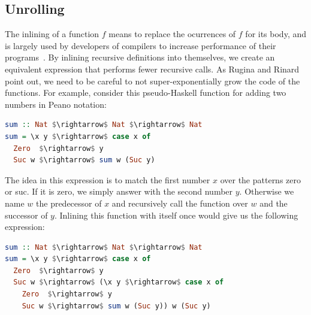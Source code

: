 \documentclass[runningheads]{llncs}
\newcommand{\tN}{\mathbb{N}}
\begin{document}
\subsection{Unrolling}
The inlining of a function $f$ means to replace 
the ocurrences of $f$ for its body, and is largely used 
by developers of compilers to increase performance 
of their programs~\cite{appel04}. By 
inlining recursive definitions into themselves, 
we create an equivalent expression that performs 
fewer recursive calls. As Rugina and 
Rinard~\cite{rugina00} point out, we need to be 
careful to not super-exponentially grow the code 
of the functions. For example, consider this 
pseudo-Haskell function for adding two numbers in Peano notation:

\begin{lstlisting}[language=Haskell, mathescape=true]
sum :: Nat $\rightarrow$ Nat $\rightarrow$ Nat
sum = \x y $\rightarrow$ case x of 
  Zero  $\rightarrow$ y
  Suc w $\rightarrow$ sum w (Suc y)
\end{lstlisting}


\noindent The idea in this expression is to match the first 
number $x$ over the patterns zero or suc. If it is 
zero, we simply answer with the second number $y$. 
Otherwise we name $w$ the predecessor of $x$ and 
recursively call the function over $w$ and the 
successor of $y$. Inlining this function with itself 
once would give us the following expression:

\begin{lstlisting}[language=Haskell, mathescape=true]
sum :: Nat $\rightarrow$ Nat $\rightarrow$ Nat
sum = \x y $\rightarrow$ case x of 
  Zero  $\rightarrow$ y
  Suc w $\rightarrow$ (\x y $\rightarrow$ case x of 
    Zero  $\rightarrow$ y
    Suc w $\rightarrow$ sum w (Suc y)) w (Suc y)
\end{lstlisting}
\end{document}
